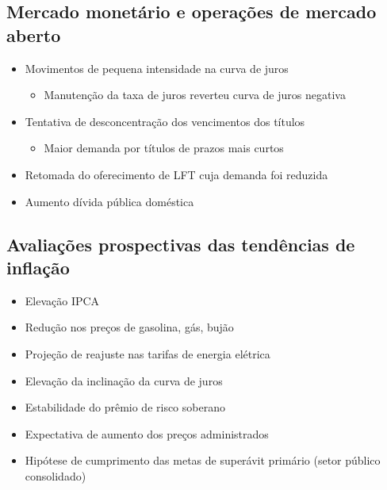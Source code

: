 \documentclass[11pt]{article}
\begin{document}
\subsection*{Mercado monetário e operações de mercado aberto}
\label{sec:org7c586b9}
\begin{itemize}
\item Movimentos de pequena intensidade na curva de juros
\begin{itemize}
\item Manutenção da taxa de juros reverteu curva de juros negativa
\end{itemize}
\item Tentativa de desconcentração dos vencimentos dos títulos 
\begin{itemize}
\item Maior demanda por títulos de prazos mais curtos
\end{itemize}
\item Retomada do oferecimento de LFT cuja demanda foi reduzida
\item Aumento dívida pública doméstica
\end{itemize}
\subsection*{Avaliações prospectivas das tendências de inflação}
\label{sec:org84ec6cc}

\begin{itemize}
\item Elevação IPCA
\item Redução nos preços de gasolina, gás, bujão
\item Projeção de reajuste nas tarifas de energia elétrica
\item Elevação da inclinação da curva de juros
\item Estabilidade do prêmio de risco soberano
\item Expectativa de aumento dos preços administrados
\item Hipótese de cumprimento das metas de superávit primário (setor público consolidado)
\end{itemize}
\end{document}
